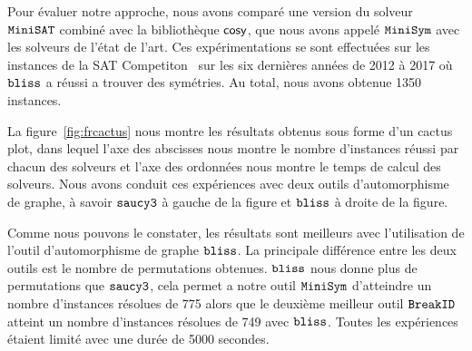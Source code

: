 Pour évaluer notre approche, nous avons comparé une version du solveur $\texttt{MiniSAT}$ combiné avec la bibliothèque $\textsf{cosy}$, que nous avons appelé $\texttt{MiniSym}$ avec les solveurs de l'état de l'art.
Ces expérimentations se sont effectuées sur les instances de la SAT Competiton~\cite{jarvisalo2012international} sur les six dernières années de 2012 à 2017 où $\texttt{bliss}$ a réussi a trouver des symétries. Au total, nous avons obtenue 1350 instances.

La figure~\ref{fig:frcactus} nous montre les résultats obtenus sous forme d'un cactus plot, 
dans lequel l'axe des abscisses nous montre le nombre d'instances réussi par chacun des solveurs et l'axe des ordonnées nous montre le temps de calcul des solveurs.
Nous avons conduit ces expériences avec deux outils d'automorphisme de graphe, à savoir 
 $\texttt{saucy3}$ à gauche de la figure et $\texttt{bliss}$ à droite de la figure. 
 
Comme nous pouvons le constater, les résultats sont meilleurs  avec l'utilisation de l'outil d'automorphisme de 
graphe $\texttt{bliss}$. La principale différence entre les deux outils est le nombre de permutations obtenues.
 $\texttt{bliss}$ nous donne plus de permutations que $\texttt{saucy3}$, cela permet a notre outil $\texttt{MiniSym}$ d'atteindre 
un nombre d'instances résolues de 775 alors que le deuxième meilleur outil $\texttt{BreakID}$ atteint un nombre d'instances résolues de 749 avec $\texttt{bliss}$. Toutes les expériences étaient limité avec une durée de 5000 secondes.

